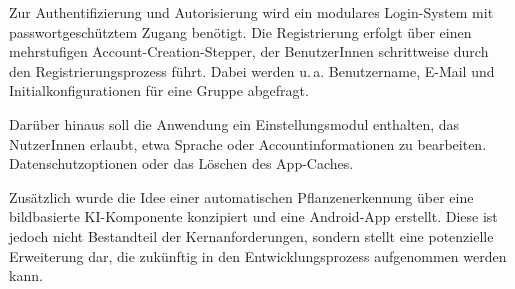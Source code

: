 Zur Authentifizierung und Autorisierung wird ein modulares Login-System mit passwortgeschütztem Zugang benötigt. Die Registrierung erfolgt über einen mehrstufigen Account-Creation-Stepper, der BenutzerInnen schrittweise durch den Registrierungsprozess führt. Dabei werden u.\,a. Benutzername, E-Mail und Initialkonfigurationen für eine Gruppe abgefragt.

Darüber hinaus soll die Anwendung ein Einstellungsmodul enthalten, das NutzerInnen erlaubt, etwa Sprache oder Accountinformationen zu bearbeiten. Datenschutzoptionen oder das Löschen des App-Caches. 

Zusätzlich wurde die Idee einer automatischen Pflanzenerkennung über eine bildbasierte \ac{KI}-Komponente konzipiert und eine Android-App erstellt. Diese ist jedoch nicht Bestandteil der Kernanforderungen, sondern stellt eine potenzielle Erweiterung dar, die zukünftig in den Entwicklungsprozess aufgenommen werden kann.

